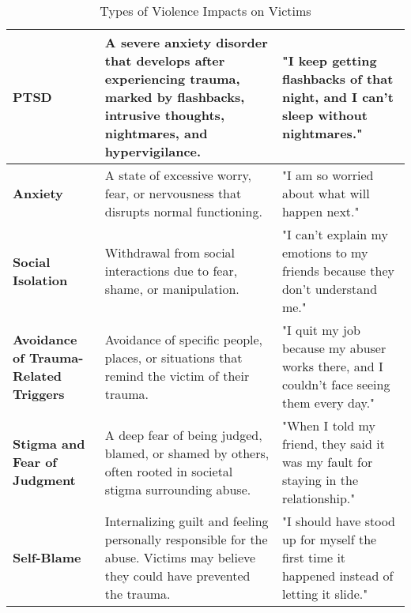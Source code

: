 \documentclass[11pt]{article}
\begin{document}
\begin{table}[htb]
\begin{tabular}{|p{4cm}|p{4cm}|p{8cm}|}
    \textbf{PTSD} & A severe anxiety disorder that develops after experiencing trauma, marked by flashbacks, intrusive thoughts, nightmares, and hypervigilance. & "I keep getting flashbacks of that night, and I can't sleep without nightmares." \\ \hline
    \textbf{Anxiety} & A state of excessive worry, fear, or nervousness that disrupts normal functioning. & "I am so worried about what will happen next." \\ \hline
    \textbf{Social Isolation} & Withdrawal from social interactions due to fear, shame, or manipulation. & "I can't explain my emotions to my friends because they don't understand me." \\ \hline
    \textbf{Avoidance of Trauma-Related Triggers} & Avoidance of specific people, places, or situations that remind the victim of their trauma. & "I quit my job because my abuser works there, and I couldn't face seeing them every day." \\ \hline
    \textbf{Stigma and Fear of Judgment} & A deep fear of being judged, blamed, or shamed by others, often rooted in societal stigma surrounding abuse. & "When I told my friend, they said it was my fault for staying in the relationship." \\ \hline
    \textbf{Self-Blame} & Internalizing guilt and feeling personally responsible for the abuse. Victims may believe they could have prevented the trauma. & "I should have stood up for myself the first time it happened instead of letting it slide." \\ \hline
    \end{tabular}
    \caption{Types of Violence Impacts on Victims}
    \label{table:violence_impact}
\end{table}







% 
% 

% 
  
  
\end{document}
